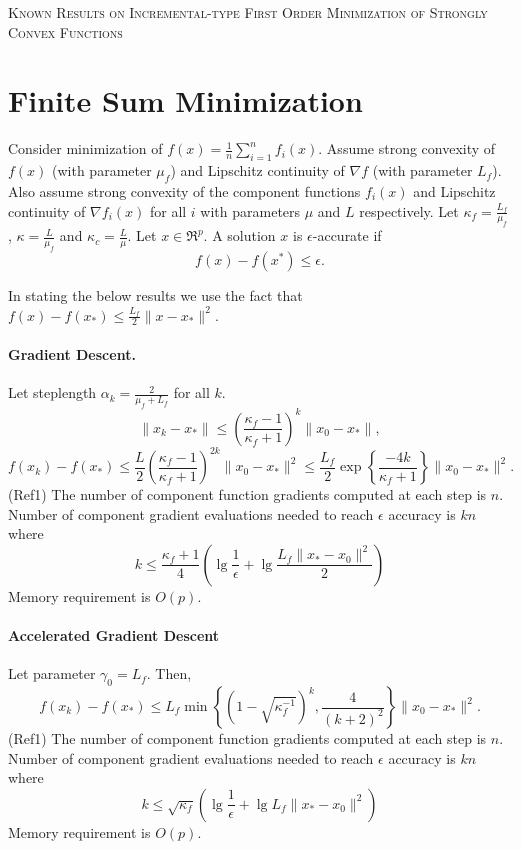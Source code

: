 \documentclass{article}
\begin{document}
\begin{center}
{\large \textsc{Known Results on Incremental-type First Order Minimization of Strongly Convex Functions}}
\end{center} 
 
 \section{Finite Sum Minimization}
  
  Consider minimization of $f(x)=\frac{1}{n}\sum_{i=1}^n f_i(x)$.  Assume strong convexity of $f(x)$ (with parameter $\mu_f$) and Lipschitz continuity of $\nabla f$ (with parameter $L_f$).  Also assume strong convexity of the component functions $f_i(x)$ and Lipschitz continuity of $\nabla f_i(x)$ for all $i$ with parameters $\mu$ and $L$ respectively.  Let $\kappa_f=\displaystyle\frac{L_f}{\mu_f}$, $\kappa=\displaystyle\frac{L}{\mu_f}$ and $\kappa_c=\displaystyle\frac{L}{\mu}$.  Let $x\in \Re^p$.  A solution $x$ is $\epsilon$-accurate if 
  \[
   f(x)-f(x^\ast) \leq \epsilon.
  \]
  
  In stating the below results we use the fact that $f(x)-f(x_\ast)\leq \displaystyle\frac{L_f}{2}\|x-x_\ast\|^2$.
  
 \paragraph{Gradient Descent.}  Let steplength $\alpha_k=\displaystyle\frac{2}{\mu_f+L_f}$ for all $k$.  
 \[
  \|x_k-x_\ast\| \leq \left(\frac{\kappa_f-1}{\kappa_f+1}\right)^k \|x_0-x_\ast\|,
 \]
 \[
  f(x_k)-f(x_\ast) \leq \frac{L}{2}\left(\frac{\kappa_f-1}{\kappa_f+1}\right)^{2k} \|x_0-x_\ast\|^2 \leq \frac{L_f}{2} \exp\left\lbrace\frac{-4k}{\kappa_f+1}\right\rbrace\|x_0-x_\ast\|^2.
 \]
 (Ref1) The number of component function gradients computed at each step is $n$.  Number of component gradient evaluations needed to reach $\epsilon$ accuracy is $kn$ where
 \[
  k\leq \frac{\kappa_f+1}{4} \left(\lg\frac{1}{\epsilon}+\lg\frac{L_f\|x_\ast-x_0\|^2}{2}\right)
 \]
 Memory requirement is $O(p)$.
 
 
 \paragraph{Accelerated Gradient Descent} Let parameter $\gamma_0=L_f$.  Then,
 \[
  f(x_k)-f(x_\ast) \leq L_f \min\left\lbrace(1-\sqrt{\kappa_f^{-1}})^k, \frac{4}{(k+2)^2}\right\rbrace\|x_0-x_\ast\|^2.
 \]
(Ref1) The number of component function gradients computed at each step is $n$.  Number of component gradient evaluations needed to reach $\epsilon$ accuracy is $kn$ where
 \[
  k\leq \sqrt{\kappa_f} \left(\lg\frac{1}{\epsilon}+\lg L_f\|x_\ast-x_0\|^2\right)
 \]
 Memory requirement is $O(p)$.
 
\end{document}

